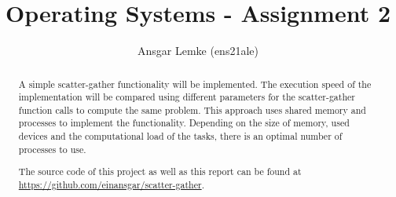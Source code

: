 \documentclass[a4paper]{article}
\let\oldAuthor\author
\renewcommand{\author}[1]{\newcommand{\myAuthor}{#1}\oldAuthor{#1}}
\begin{document}

\lstset{style=CStyle}

\title{Operating Systems - Assignment 2}
\author{Ansgar Lemke (ens21ale)}
\date{} %
\begin{titlepage}
\maketitle 
\thispagestyle{fancy}
\headheight 35pt 
\rhead{\small\today}
\begin{abstract}
A simple scatter-gather functionality will be implemented.
The execution speed of the implementation will be compared using different parameters for the scatter-gather function calls to compute the same problem.
This approach uses shared memory and processes to implement the functionality.
Depending on the size of memory, used devices and the computational load of the tasks, there is an optimal number of processes to use.

The source code of this project as well as this report can be found at \href{https://github.com/einansgar/scatter-gather}{https://github.com/einansgar/scatter-gather}.

\end{abstract}

\end{titlepage}
\pagestyle{fancy}
\headheight 35pt 
\rhead{\small\today}
\lhead{\myAuthor}
\cfoot{\thepage}
\end{document}
